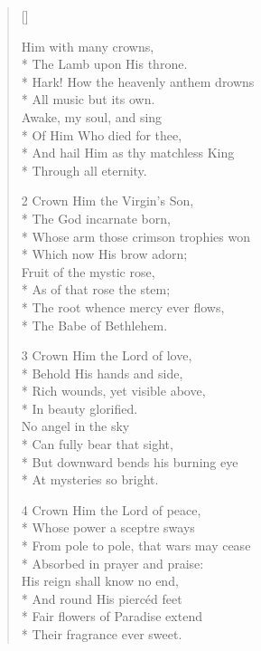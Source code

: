 \newHymn
{}

\begin{verse}[\versewidth]
\begin{altverse}
 Him with many crowns,\\*
The Lamb upon His throne.\\*
Hark! How the heavenly anthem drowns \\*
All music but its own.\\
Awake, my soul, and sing\\*
Of Him Who died for thee,\\*
And hail Him as thy matchless King \\*
Through all eternity.
\end{altverse}

\begin{altverse}
\item[2]Crown Him the Virgin's Son, \\*
The God incarnate born,\\*
Whose arm those crimson trophies won \\*
Which now His brow adorn;\\
Fruit of the mystic rose, \\*
As of that rose the stem;\\*
The root whence mercy ever flows, \\*
The Babe of Bethlehem.
\end{altverse}

\begin{altverse}
\item[3]Crown Him the Lord of love, \\*
Behold His hands and side,\\*
Rich wounds, yet visible above, \\*
In beauty glorified.\\
No angel in the sky \\*
Can fully bear that sight,\\*
But downward bends his burning eye \\*
At mysteries so bright.
\end{altverse}

\begin{altverse}
\item[4]Crown Him the Lord of peace,\\*
Whose power a sceptre sways\\*
From pole to pole, that wars may cease\\*
Absorbed in prayer and praise:\\
His reign shall know no end,\\*
And round His piercéd feet\\*
Fair flowers of Paradise extend\\*
Their fragrance ever sweet.
\end{altverse}


\end{verse}
